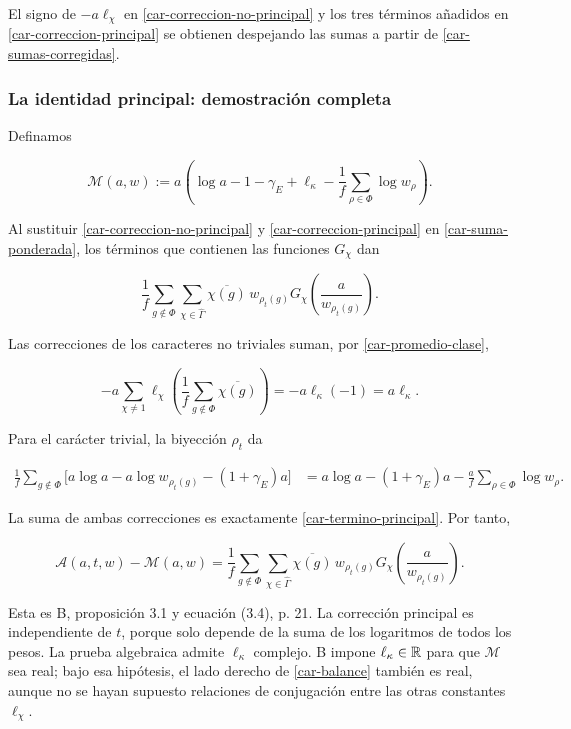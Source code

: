 El signo de $-a\ell_\chi$ en \eqref{car-correccion-no-principal} y los tres términos añadidos en \eqref{car-correccion-principal} se obtienen despejando las sumas a partir de \eqref{car-sumas-corregidas}.

\subsubsection*{La identidad principal: demostración completa}

Definamos

\begin{equation}
\mathcal M(a,w)
:=a\left(
\log a-1-\gamma_E+\ell_\kappa
-\frac1f\sum_{\rho\in\Phi}\log w_\rho
\right).
\label{car-termino-principal}
\end{equation}

Al sustituir \eqref{car-correccion-no-principal} y \eqref{car-correccion-principal} en \eqref{car-suma-ponderada}, los términos que contienen las funciones $G_\chi$ dan

\begin{equation}
\frac1f\sum_{g\notin\Phi}
\sum_{\chi\in\widehat\Gamma}
\overline{\chi(g)}\,w_{\rho_t(g)}
G_\chi\!\left(\frac a{w_{\rho_t(g)}}\right).
\label{car-resto}
\end{equation}

Las correcciones de los caracteres no triviales suman, por \eqref{car-promedio-clase},

\[
-a\sum_{\chi\ne1}\ell_\chi
\left(\frac1f\sum_{g\notin\Phi}\overline{\chi(g)}\right)
=-a\ell_\kappa(-1)
=a\ell_\kappa.
\]

Para el carácter trivial, la biyección $\rho_t$ da

\[
\begin{aligned}
\frac1f\sum_{g\notin\Phi}
\bigl[a\log a-a\log w_{\rho_t(g)}-(1+\gamma_E)a\bigr]
&=a\log a-(1+\gamma_E)a
-\frac af\sum_{\rho\in\Phi}\log w_\rho.
\end{aligned}
\]

La suma de ambas correcciones es exactamente \eqref{car-termino-principal}. Por tanto,

\begin{equation}
\boxed{
\mathcal A(a,t,w)-\mathcal M(a,w)
=\frac1f\sum_{g\notin\Phi}
\sum_{\chi\in\widehat\Gamma}
\overline{\chi(g)}\,w_{\rho_t(g)}
G_\chi\!\left(\frac a{w_{\rho_t(g)}}\right).
}
\label{car-balance}
\end{equation}

Esta es B, proposición 3.1 y ecuación (3.4), p. 21. La corrección principal es independiente de $t$, porque solo depende de la suma de los logaritmos de todos los pesos. La prueba algebraica admite $\ell_\kappa$ complejo. B impone $\ell_\kappa\in\mathbb{R}$ para que $\mathcal M$ sea real; bajo esa hipótesis, el lado derecho de \eqref{car-balance} también es real, aunque no se hayan supuesto relaciones de conjugación entre las otras constantes $\ell_\chi$.


